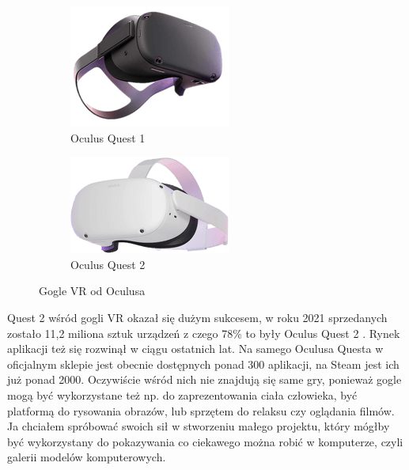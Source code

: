\documentclass[a4paper,12pt,reqno]{article}
\begin{document}
\begin{figure}[!ht]%
	\centering
	\begin{subfigure}{.5\textwidth}
		\centering
		\includegraphics[width=0.8\linewidth]{graphics/oculusquest.png}
		\caption{Oculus Quest 1}	
		\label{ref:subref_a}
	\end{subfigure}%
	\begin{subfigure}{.5\textwidth}
		\centering
		\includegraphics[width=0.8\linewidth]{graphics/oculusquest2.png}
		\caption{Oculus Quest 2}
		\label{ref:subref_b}
	\end{subfigure}%
	

\caption{Gogle VR od Oculusa}
\label{ref:ref}
\end{figure}

Quest 2 wśród gogli VR okazał się dużym sukcesem, w roku 2021
sprzedanych zostało 11,2 miliona sztuk urządzeń z czego 78\% to były Oculus Quest
2 \cite{Sprzedasz_gogli_VR}. Rynek aplikacji też się rozwinął w ciągu ostatnich lat. Na samego Oculusa Questa
w oficjalnym sklepie jest obecnie dostępnych ponad 300 aplikacji, na Steam jest ich
już ponad 2000. Oczywiście wśród nich nie znajdują się same gry, ponieważ gogle
mogą być wykorzystane też np. do zaprezentowania ciała człowieka, być platformą
do rysowania obrazów, lub sprzętem do relaksu czy oglądania filmów. Ja chciałem
spróbować swoich sił w stworzeniu małego projektu, który mógłby być wykorzystany
do pokazywania co ciekawego można robić w komputerze, czyli galerii modelów
komputerowych.
\end{document}
